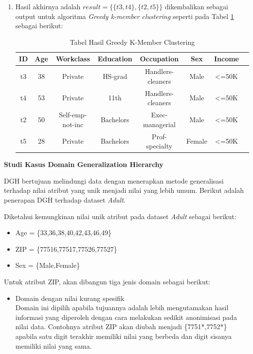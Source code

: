 \documentclass[a4paper,twoside]{article}
\begin{document}
\begin{enumerate}
\begin{enumerate}
\item Hasil akhirnya adalah $result = \{\{t3, t4\}, \{t2, t5\}\}$ dikembalikan sebagai output untuk algoritma \textit{Greedy k-member clustering} seperti pada Tabel \ref{table:greedykmember} sebagai berikut:
\begin{table}[H]
\centering
\caption{Tabel Hasil Greedy K-Member Clustering}
\begin{tabular}{c c c c c c c c}
\hline 
ID & Age & Workclass & Education & Occupation & Sex & Income\\ 
\hline 
t3 & 38 & Private & HS-grad & Handlers-cleaners & Male & <=50K  \\ 
t4 & 53 & Private & 11th & Handlers-cleaners & Male & <=50K  \\ 
\hline 
t2 & 50 & Self-emp-not-inc & Bachelors & Exec-managerial & Male & <=50K  \\ 
t5 & 28 & Private & Bachelors & Prof-specialty & Female & <=50K	 \\ 
\hline 
\end{tabular} 
\label{table:greedykmember}
\end{table}

\end{enumerate}

\textbf{Studi Kasus Domain Generalization Hierarchy}

DGH bertujuan  melindungi data dengan menerapkan metode generalisasi terhadap nilai atribut yang unik menjadi nilai yang lebih umum. Berikut adalah penerapan DGH terhadap dataset \textit{Adult}. 

\noindent Diketahui kemungkinan nilai unik atribut pada dataset \textit{Adult} sebagai berikut:

\begin{itemize}
\item Age = \{33,36,38,40,42,43,46,49\}
\item ZIP = \{77516,77517,77526,77527\}
\item Sex = \{Male,Female\}
\end{itemize}

\noindent Untuk atribut ZIP, akan dibangun tiga jenis domain sebagai berikut:

\begin{itemize}
\item Domain dengan nilai kurang spesifik\\
Domain ini dipilih apabila tujuannya adalah lebih mengutamakan hasil informasi yang diperoleh dengan cara melakukan sedikit anonimisasi pada nilai data. Contohnya atribut ZIP akan diubah menjadi \{7751*,7752*\} apabila satu digit terakhir memiliki nilai yang berbeda dan digit sisanya memiliki nilai yang sama.


\end{itemize}
\end{enumerate}
\end{document}
